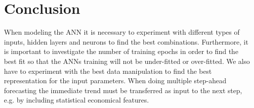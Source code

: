 \section{Conclusion}
When modeling the ANN it is necessary to experiment with different types of inputs, hidden layers and neurons to find the best combinations. Furthermore, it is important to investigate the number of training epochs in order to find the best fit so that the ANNs training will not be under-fitted or over-fitted. We also have to experiment with the best data manipulation to find the best representation for the input parameters. When doing multiple step-ahead forecasting the immediate trend must be transferred as input to the next step, e.g. by including statistical economical features.